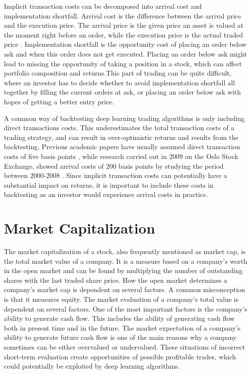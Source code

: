 \indent\newline   
Implicit transaction costs can be decomposed into arrival cost and implementation shortfall. Arrival cost is the difference between the arrival price and the execution price. The arrival price is the given price an asset is valued at the moment right before an order, while the execution price is the actual traded price \cite{morgan}. Implementation shortfall is the opportunity cost of placing an order below ask and when this order does not get executed. Placing an order below ask might lead to missing the opportunity of taking a position in a stock, which can affect portfolio composition and returns.This part of trading can be quite difficult, where an investor has to decide whether to avoid implementation shortfall all together by filling the current orders at ask, or placing an order below ask with hopes of getting a better entry price. 

\indent\newline   
A common way of backtesting deep learning trading algorithms is only including direct transactions costs. This underestimates the total transaction costs of a trading strategy, and can result in over-optimistic returns and results from the backtesting. Previous academic papers have usually assumed direct transaction costs of five basis points \cite{krauss}, while research carried out in 2009 on the Oslo Stock Exchange, showed arrival costs of 200 basis points by studying the period between 2000-2008 \cite{ode}. Since implicit transaction costs can potentially have a substantial impact on returns, it is important to include these costs in backtesting as an investor would experience arrival costs in practice.     

\section{Market Capitalization}
The market capitalization of a stock, also frequently mentioned as market cap, is the total market value of a company. It is a measure based on a company's worth in the open market and can be found by multiplying the number of outstanding shares with the last traded share price. How the open market determines a company's market cap is dependent on several factors. A common misconception is that it measures equity. The market evaluation of a company's total value is dependent on several factors. One of the most important factors is the company's ability to generate cash flow. This includes the ability of generating cash flow both in present time and in the future. The market expectation of a company's ability to generate future cash flow is one of the main reasons why a company sometimes can be either overvalued or undervalued. These situations of incorrect short-term evaluation create opportunities of possible profitable trades, which could potentially be exploited by deep learning algorithms.  

